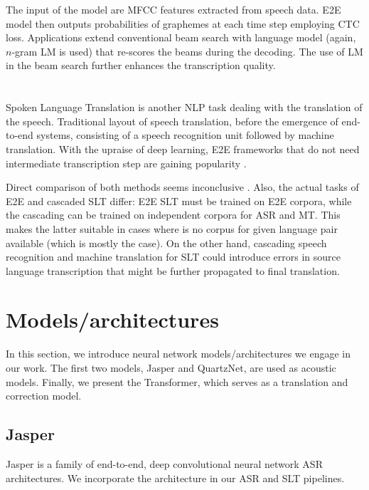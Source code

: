The input of the model are MFCC features extracted from speech data. E2E model then outputs probabilities of graphemes at each time step employing CTC loss. Applications extend conventional beam search with language model (again, $n$-gram LM is used) that re-scores the beams during the decoding. The use of LM in the beam search further enhances the transcription quality.

\section{}
Spoken Language Translation is another NLP task dealing with the translation of the speech.  Traditional layout of speech translation, before the emergence of end-to-end systems, consisting of a speech recognition unit followed by machine translation. With the upraise of deep learning, E2E frameworks that do not need intermediate transcription step are gaining popularity .

Direct comparison of both methods seems inconclusive . Also, the actual tasks of E2E and cascaded SLT differ: E2E SLT must be trained on E2E corpora, while the cascading can be trained on independent corpora for ASR and MT. This makes the latter suitable in cases where is no corpus for given language pair available (which is mostly the case). On the other hand, cascading speech recognition and machine translation for SLT could introduce errors in source language transcription that might be further propagated to final translation.

\section{Models/architectures}
In this section, we introduce neural network models/architectures we engage in our work. The first two models, Jasper and QuartzNet, are used as acoustic models. Finally, we present the Transformer, which serves as a translation and correction model.

\subsection{Jasper}

Jasper  is a family of end-to-end, deep convolutional neural network ASR architectures. We incorporate the architecture in our ASR and SLT pipelines.

